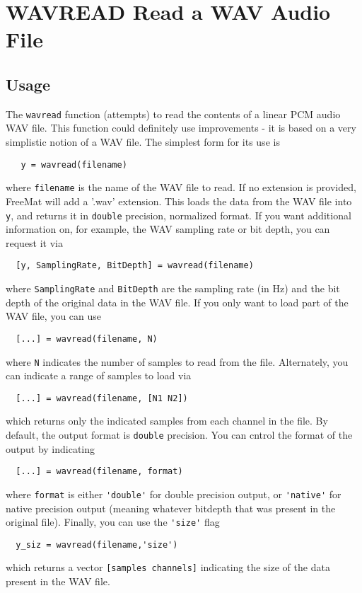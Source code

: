 \section{WAVREAD Read a WAV Audio File}

\subsection{Usage}

The \verb|wavread| function (attempts) to read the contents of a linear PCM
audio WAV file.  This function could definitely use improvements - it is
based on a very simplistic notion of a WAV file.  The simplest form for
its use is
\begin{verbatim}
   y = wavread(filename)
\end{verbatim}
where \verb|filename| is the name of the WAV file to read.  If no extension
is provided, FreeMat will add a '.wav' extension.  This loads the data
from the WAV file into \verb|y|, and returns it in \verb|double| precision,
normalized format.  If you want additional information on, for example,
the WAV sampling rate or bit depth, you can request it via
\begin{verbatim}
  [y, SamplingRate, BitDepth] = wavread(filename)
\end{verbatim}
where \verb|SamplingRate| and \verb|BitDepth| are the sampling rate (in Hz) and
the bit depth of the original data in the WAV file.  If you only want to
load part of the WAV file, you can use
\begin{verbatim}
  [...] = wavread(filename, N)
\end{verbatim}
where \verb|N| indicates the number of samples to read from the file.
Alternately, you can indicate a range of samples to load via
\begin{verbatim}
  [...] = wavread(filename, [N1 N2])
\end{verbatim}
which returns only the indicated samples from each channel in the file.
By default, the output format is \verb|double| precision.  You can cntrol
the format of the output by indicating
\begin{verbatim}
  [...] = wavread(filename, format)
\end{verbatim}
where \verb|format| is either \verb|'double'| for double precision output, or
\verb|'native'| for native precision output (meaning whatever bitdepth that
was present in the original file).  Finally, you can use the \verb|'size'| flag
\begin{verbatim}
  y_siz = wavread(filename,'size')
\end{verbatim}
which returns a vector \verb|[samples channels]| indicating the size of the
data present in the WAV file.
